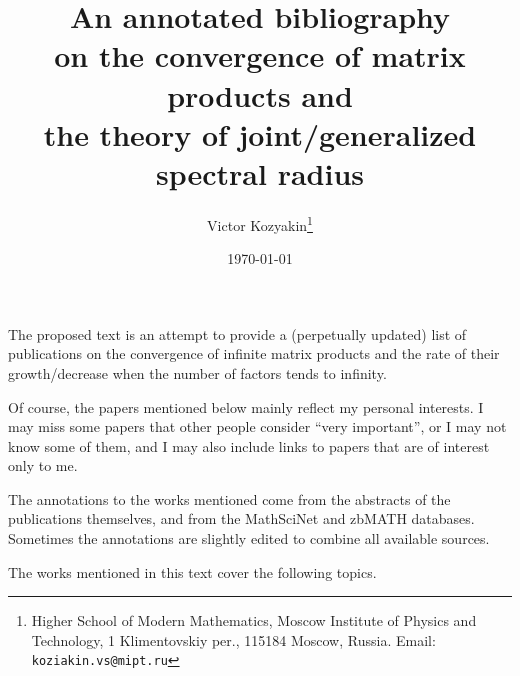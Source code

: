\documentclass[a4paper,fleqn]{article}
\begin{document}
\title{\bf An annotated bibliography\\ on the convergence of matrix
  products and\\ the theory of joint/generalized spectral radius}

\author{Victor Kozyakin\thanks{Higher School of Modern Mathematics, Moscow
    Institute of Physics and Technology, 1 Klimentovskiy per., 115184 Moscow,
    Russia. Email: \texttt{koziakin.vs@mipt.ru}}}

\date{\today}

\maketitle

The proposed text is an attempt to provide a (perpetually updated) list
of publications on the convergence of infinite matrix products and the
rate of their growth/decrease when the number of factors tends to
infinity.

Of course, the papers mentioned below mainly reflect my personal
interests. I may miss some papers that other people consider ``very
important'', or I may not know some of them, and I may also include
links to papers that are of interest only to me.

The annotations to the works mentioned come from the abstracts of the
publications themselves, and from the MathSciNet and zbMATH databases.
Sometimes the annotations are slightly edited to combine all available
sources.

The works mentioned in this text cover the following topics.
\end{document}
